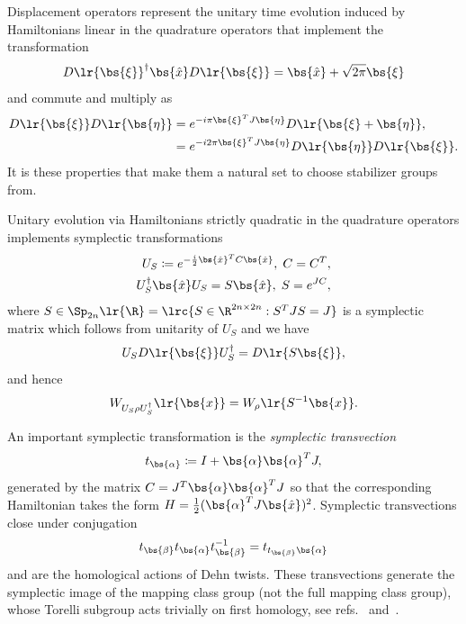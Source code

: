 \documentclass[a4paper, aps, pra, 11pt, onecolumn, tightenlines, superscriptaddress]{revtex4-2}
\begin{document}
Displacement operators represent the unitary time evolution induced by Hamiltonians linear in the quadrature operators that implement the transformation 
\begin{equation}
D\lr{\bs{\xi}}^{\dagger} \bs{\hat{x}}D\lr{\bs{\xi}}=\bs{\hat{x}} + \sqrt{2\pi}\bs{\xi}
\end{equation}
 and commute and multiply as
\begin{align}
D\lr{\bs{\xi}}D\lr{\bs{\eta}}&=e^{-i\pi \bs{\xi}^TJ\bs{\eta}}D\lr{\bs{\xi}+\bs{\eta}}, \\
&=e^{-i2\pi \bs{\xi}^TJ\bs{\eta}}D\lr{\bs{\eta}}D\lr{\bs{\xi}}.\label{eq:displacement_commutator}
\end{align}
It is these properties that make them a natural set to choose stabilizer groups from.

Unitary evolution via Hamiltonians strictly quadratic in the quadrature operators implements symplectic transformations
\begin{align}
U_S\coloneqq e^{-\frac{i}{2}\bs{\hat{x}}^T C \bs{\hat{x}}},\; C=C^T, \\
U_S^{\dagger}\bs{\hat{x}}U_S=S\bs{\hat{x}},\; S=e^{JC}, \label{eq:sympH}
\end{align}
where $S\in \Sp_{2n}\lr{\R}=\lrc{S\in \R^{2n\times 2n} : S^TJS=J}$ is a symplectic matrix which follows from unitarity of $U_S$ and we have 
\begin{equation}
U_{S}D\lr{\bs{\xi}}U_{S}^{\dagger}=D\lr{S\bs{\xi}},
\end{equation}
and hence
\begin{equation}
W_{U_S\rho U_S^{\dagger}}\lr{\bs{x}}=W_{\rho}\lr{S^{-1}\bs{x}}.
\end{equation}


An important symplectic transformation is the \textit{symplectic transvection}
\begin{equation}
t_{\bs{\alpha}}\coloneqq I+\bs{\alpha}\bs{\alpha}^TJ,
\end{equation}
generated by the matrix $C=J^T\bs{\alpha}\bs{\alpha}^TJ$ so that the corresponding Hamiltonian takes the form $H=\frac{1}{2}(\bs{\alpha}^TJ\bs{\hat{x}})^2$. 
Symplectic transvections close under conjugation 
\begin{equation}
t_{\bs{\beta}}t_{\bs{\alpha}}t_{\bs{\beta}}^{-1}=t_{t_{\bs{\beta}}\bs{\alpha}}
\end{equation}
and are the homological actions of Dehn twists. These transvections generate the symplectic image of the mapping class group (not the full mapping class group), whose Torelli subgroup acts trivially on first homology, see refs.~\cite{omeara_symplectic_1978} and~\cite[Prop.~6.3, Thm.~6.4 and Sec.~6.5]{FarbMargalit+2012}.
\end{document}
